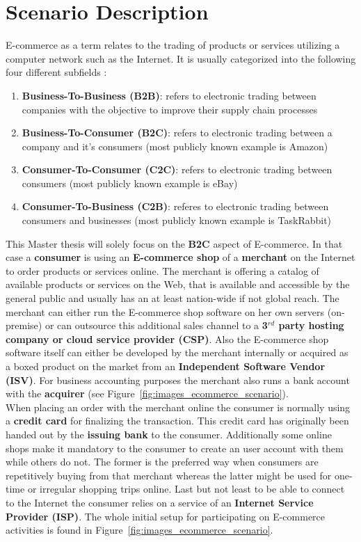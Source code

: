 
\section{Scenario Description}
\label{sec:scenario_description}

E-commerce as a term relates to the trading of products or services utilizing a computer network such as the Internet. It is usually categorized into the following four different subfields \citep{sen2015study}:\@

\begin{enumerate}
  \item \textbf{Business-To-Business (\gls{B2B})}: refers to electronic trading between companies with the objective to improve their supply chain processes
  \item \textbf{Business-To-Consumer (\gls{B2C})}: refers to electronic trading between a company and it's consumers (most publicly known example is Amazon)
  \item \textbf{Consumer-To-Consumer (\gls{C2C})}: refers to electronic trading between consumers (most publicly known example is eBay)
  \item \textbf{Consumer-To-Business (\gls{C2B})}: referes to electronic trading between consumers and businesses (most publicly known example is TaskRabbit)
\end{enumerate}

This Master thesis will solely focus on the \textbf{B2C} aspect of E-commerce. In that case a \textbf{consumer} is using an \textbf{E-commerce shop} of a \textbf{merchant} on the Internet to order products or services online. The merchant is offering a catalog of available products or services on the Web, that is available and accessible by the general public and usually has an at least nation-wide if not global reach. The merchant can either run the E-commerce shop software on her own servers (on-premise) or can outsource this additional sales channel to a \textbf{3$^{rd}$ party hosting company or cloud service provider (\gls{CSP})}. Also the E-commerce shop software itself can either be developed by the merchant internally or acquired as a boxed product on the market from an \textbf{Independent Software Vendor (\gls{ISV})}. For business accounting purposes the merchant also runs a bank account with the \textbf{acquirer} (see Figure~\ref{fig:images_ecommerce_scenario}). \\
When placing an order with the merchant online the consumer is normally using a \textbf{credit card} for finalizing the transaction. This credit card has originally been handed out by the \textbf{issuing bank} to the consumer. Additionally some online shops make it mandatory to the consumer to create an user account with them while others do not. The former is the preferred way when consumers are repetitively buying from that merchant whereas the latter might be used for one-time or irregular shopping trips online. Last but not least to be able to connect to the Internet the consumer relies on a service of an \textbf{Internet Service Provider (\gls{ISP})}. The whole initial setup for participating on E-commerce activities is found in Figure~\ref{fig:images_ecommerce_scenario}.\@

